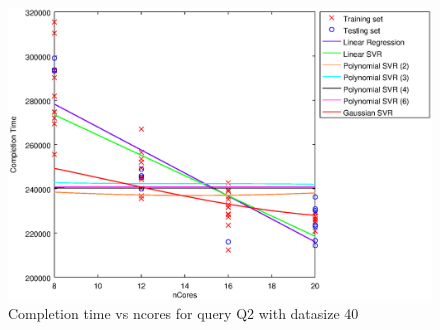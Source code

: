 
\begin {figure}[hbtp]
\centering
\includegraphics[width=\textwidth]{output/Q2_40_ALL_FEATURES/plot_Q2_40.eps}
\caption{Completion time vs ncores for query Q2 with datasize 40}
\label{fig:all_linear_Q2_40}
\end {figure}
